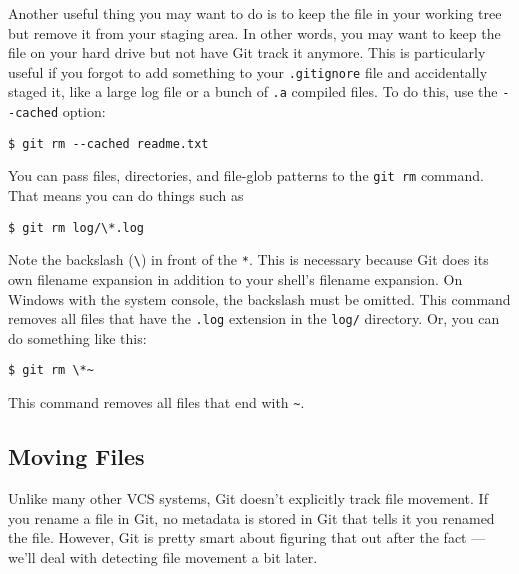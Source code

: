 \documentclass[a4paper]{book}
\begin{document}
Another useful thing you may want to do is to keep the file in your working tree but remove it from your staging area. In other words, you may want to keep the file on your hard drive but not have Git track it anymore. This is particularly useful if you forgot to add something to your \texttt{.gitignore} file and accidentally staged it, like a large log file or a bunch of \texttt{.a} compiled files. To do this, use the \texttt{-{}-cached} option:

\begin{shaded}\begin{verbatim}
$ git rm --cached readme.txt
\end{verbatim}\end{shaded}

You can pass files, directories, and file-glob patterns to the \texttt{git rm} command. That means you can do things such as

\begin{shaded}\begin{verbatim}
$ git rm log/\*.log
\end{verbatim}\end{shaded}

Note the backslash (\texttt{\textbackslash{}}) in front of the \texttt{*}. This is necessary because Git does its own filename expansion in addition to your shell's filename expansion. On Windows with the system console, the backslash must be omitted. This command removes all files that have the \texttt{.log} extension in the \texttt{log/} directory. Or, you can do something like this:

\begin{shaded}\begin{verbatim}
$ git rm \*~
\end{verbatim}\end{shaded}

This command removes all files that end with \texttt{\textasciitilde{}}.

\subsection{Moving Files}

Unlike many other VCS systems, Git doesn't explicitly track file movement. If you rename a file in Git, no metadata is stored in Git that tells it you renamed the file. However, Git is pretty smart about figuring that out after the fact --- we'll deal with detecting file movement a bit later.
\end{document}
